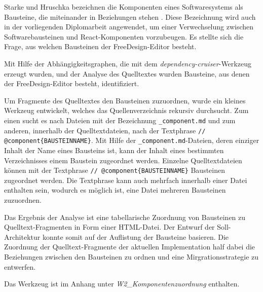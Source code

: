 

Starke und Hruschka bezeichnen die Komponenten eines Softwaresystems als Bausteine, die miteinander in Beziehungen stehen \autocite[vgl.][24]{Starke2011}. Diese Bezeichnung wird auch in der vorliegenden Diplomarbeit angewendet, um einer Verwechselung zwischen Softwarebausteinen und React-Komponenten vorzubeugen.
Es stellte sich die Frage, aus welchen Bausteinen der FreeDesign-Editor besteht.  

Mit Hilfe der Abhängigkeitsgraphen, die mit dem \emph{dependency-cruiser}-Werkzeug erzeugt wurden, und der Analyse des Quelltextes wurden Bausteine, aus denen der FreeDesign-Editor besteht, identifiziert. 

Um Fragmente des Quelltextes den Bausteinen zuzuordnen, wurde ein kleines Werkzeug entwickelt, welches das Quellenverzeichnis rekursiv durchsucht. Zum einen sucht es nach Dateien mit der Bezeichnung \glqq\lstinline|_component.md|\grqq{} und zum anderen, innerhalb der Quelltextdateien, nach der Textphrase \glqq\lstinline|// @component{BAUSTEINNAME}|\grqq{}. 
Mit Hilfe der \lstinline|_component.md|-Dateien, deren einziger Inhalt der Name eines Bausteins ist, kann der Inhalt eines bestimmten Verzeichnisses einem Baustein zugeordnet werden. Einzelne Quelltextdateien können mit der Textphrase \glqq\lstinline|// @component{BAUSTEINNAME}|\grqq{} Bausteinen zugeordnet werden. Die Textphrase kann auch mehrfach innerhalb einer Datei enthalten sein, wodurch es möglich ist, eine Datei mehreren Bausteinen zuzuordnen. 

Das Ergebnis der Analyse ist eine tabellarische Zuordnung von Bausteinen zu Quelltext-Fragmenten in Form einer HTML-Datei. 
Der Entwurf der Soll-Architektur konnte somit auf der Auflistung der Bausteine basieren. Die Zuordnung der Quelltext-Fragmente der aktuellen Implementation half dabei die Beziehungen zwischen den Bausteinen zu ordnen und eine Mirgrationsstrategie zu entwerfen.

Das Werkzeug ist im Anhang unter \emph{W2\_Komponentenzuordnung} enthalten.